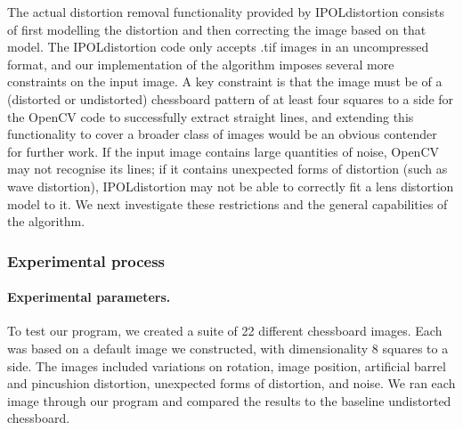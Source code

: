 The actual distortion removal functionality provided by IPOLdistortion consists of first modelling the distortion and then correcting the image based on that model. The IPOLdistortion code only accepts .tif images in an uncompressed format, and our implementation of the algorithm imposes several more constraints on the input image. A key constraint is that the image must be of a (distorted or undistorted) chessboard pattern of at least four squares to a side for the OpenCV code to successfully extract straight lines, and extending this functionality to cover a broader class of images would be an obvious contender for further work. If the input image contains large quantities of noise, OpenCV may not recognise its lines; if it contains unexpected forms of distortion (such as wave distortion), IPOLdistortion may not be able to correctly fit a lens distortion model to it. We next investigate these restrictions and the general capabilities of the algorithm.

\subsubsection{Experimental process}

\paragraph{Experimental parameters.}
To test our program, we created a suite of 22 different chessboard images. Each was based on a default image we constructed, with dimensionality 8 squares to a side. The images included variations on rotation, image position, artificial barrel and pincushion distortion, unexpected forms of distortion, and noise. We ran each image through our program and compared the results to the baseline undistorted chessboard.

